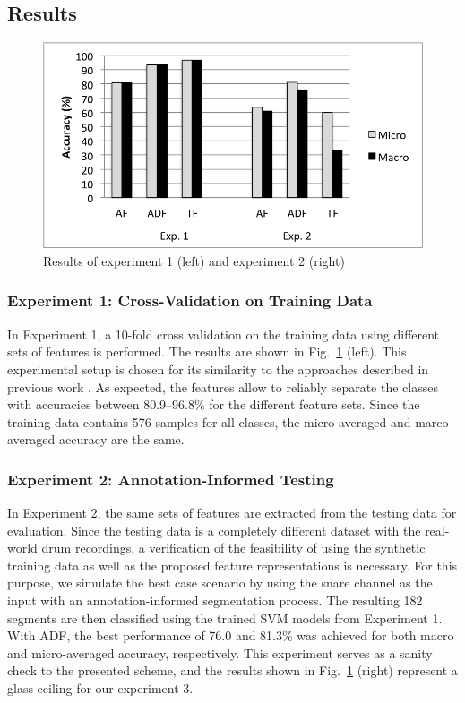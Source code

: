 \documentclass{article}
\begin{document}
\subsection{Results}\label{ssec:results}
\begin{figure}
\centering
\includegraphics[width = 8.0 cm]{./figures/exp1_exp2.png}
\caption{Results of experiment 1 (left) and experiment 2 (right)}
\label{fig:exp1n2}
\end{figure}

\subsubsection{Experiment 1: Cross-Validation on Training Data}\label{sssec:exp1}
In Experiment 1, a 10-fold cross validation on the training data using different sets of features is performed. The results are shown in Fig.~\ref{fig:exp1n2} (left). This experimental setup is chosen for its similarity to the approaches described in previous work \cite{Tindale2004, Prockup2013}. As expected, the features allow to reliably separate the classes with accuracies between 80.9--96.8\% for the different feature sets. Since the training data contains 576 samples for all classes, the micro-averaged and marco-averaged accuracy are the same.

\subsubsection{Experiment 2: Annotation-Informed Testing}\label{sssec:exp2}
In Experiment 2, the same sets of features are extracted from the testing data for evaluation. Since the testing data is a completely different dataset with the real-world drum recordings, a verification of the feasibility of using the synthetic training data as well as the proposed feature representations is necessary. For this purpose, we simulate the best case scenario by using the snare channel as the input with an annotation-informed segmentation process. The resulting 182 segments are then classified using the trained SVM models from Experiment 1. With ADF, the best performance of 76.0 and 81.3\% was achieved for both macro and micro-averaged accuracy, respectively. This experiment serves as a sanity check to the presented scheme, and the results shown in Fig.~\ref{fig:exp1n2} (right) represent a glass ceiling for our experiment 3.
\end{document}
